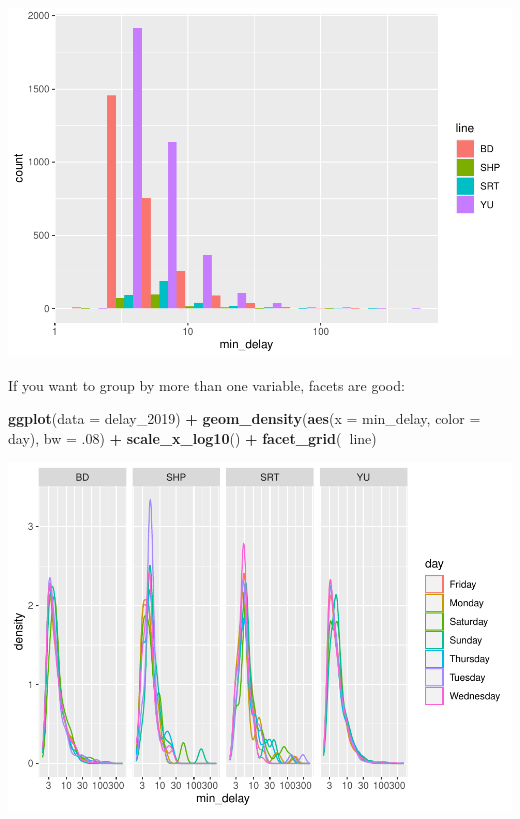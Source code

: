 \documentclass[
]{book}
\newenvironment{Shaded}{\begin{snugshade}}{\end{snugshade}}
\newcommand{\DataTypeTok}[1]{\textcolor[rgb]{0.13,0.29,0.53}{#1}}
\newcommand{\DecValTok}[1]{\textcolor[rgb]{0.00,0.00,0.81}{#1}}
\newcommand{\FloatTok}[1]{\textcolor[rgb]{0.00,0.00,0.81}{#1}}
\newcommand{\KeywordTok}[1]{\textcolor[rgb]{0.13,0.29,0.53}{\textbf{#1}}}
\newcommand{\NormalTok}[1]{#1}
\newcommand{\OperatorTok}[1]{\textcolor[rgb]{0.81,0.36,0.00}{\textbf{#1}}}
\newcommand{\StringTok}[1]{\textcolor[rgb]{0.31,0.60,0.02}{#1}}
\begin{document}
\includegraphics{telling_stories_with_data_files/figure-latex/unnamed-chunk-261-1.pdf}

If you want to group by more than one variable, facets are good:

\begin{Shaded}
\begin{Highlighting}[]
\KeywordTok{ggplot}\NormalTok{(}\DataTypeTok{data =}\NormalTok{ delay_}\DecValTok{2019}\NormalTok{) }\OperatorTok{+}\StringTok{ }
\StringTok{  }\KeywordTok{geom_density}\NormalTok{(}\KeywordTok{aes}\NormalTok{(}\DataTypeTok{x =}\NormalTok{ min_delay, }\DataTypeTok{color =}\NormalTok{ day), }\DataTypeTok{bw =} \FloatTok{.08}\NormalTok{) }\OperatorTok{+}\StringTok{ }
\StringTok{  }\KeywordTok{scale_x_log10}\NormalTok{() }\OperatorTok{+}\StringTok{ }\KeywordTok{facet_grid}\NormalTok{(}\OperatorTok{~}\NormalTok{line)}
\end{Highlighting}
\end{Shaded}

\includegraphics{telling_stories_with_data_files/figure-latex/unnamed-chunk-262-1.pdf}
\end{document}
